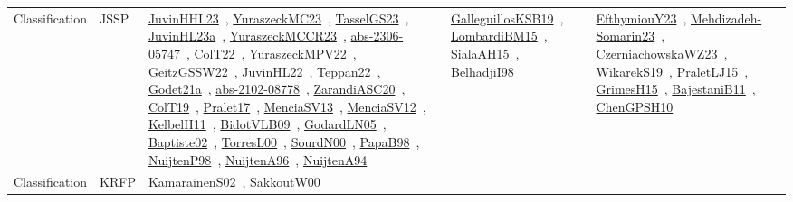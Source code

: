 {\begin{longtable}{lp{3cm}>{\raggedright\arraybackslash}p{6cm}>{\raggedright\arraybackslash}p{6cm}>{\raggedright\arraybackslash}p{8cm}}
Classification & JSSP & \href{works/JuvinHHL23.pdf}{JuvinHHL23}~\cite{JuvinHHL23}, \href{works/YuraszeckMC23.pdf}{YuraszeckMC23}~\cite{YuraszeckMC23}, \href{works/TasselGS23.pdf}{TasselGS23}~\cite{TasselGS23}, \href{works/JuvinHL23a.pdf}{JuvinHL23a}~\cite{JuvinHL23a}, \href{works/YuraszeckMCCR23.pdf}{YuraszeckMCCR23}~\cite{YuraszeckMCCR23}, \href{works/abs-2306-05747.pdf}{abs-2306-05747}~\cite{abs-2306-05747}, \href{works/ColT22.pdf}{ColT22}~\cite{ColT22}, \href{works/YuraszeckMPV22.pdf}{YuraszeckMPV22}~\cite{YuraszeckMPV22}, \href{works/GeitzGSSW22.pdf}{GeitzGSSW22}~\cite{GeitzGSSW22}, \href{works/JuvinHL22.pdf}{JuvinHL22}~\cite{JuvinHL22}, \href{works/Teppan22.pdf}{Teppan22}~\cite{Teppan22}, \href{works/Godet21a.pdf}{Godet21a}~\cite{Godet21a}, \href{works/abs-2102-08778.pdf}{abs-2102-08778}~\cite{abs-2102-08778}, \href{works/ZarandiASC20.pdf}{ZarandiASC20}~\cite{ZarandiASC20}, \href{works/ColT19.pdf}{ColT19}~\cite{ColT19}, \href{works/Pralet17.pdf}{Pralet17}~\cite{Pralet17}, \href{works/MenciaSV13.pdf}{MenciaSV13}~\cite{MenciaSV13}, \href{works/MenciaSV12.pdf}{MenciaSV12}~\cite{MenciaSV12}, \href{works/KelbelH11.pdf}{KelbelH11}~\cite{KelbelH11}, \href{works/BidotVLB09.pdf}{BidotVLB09}~\cite{BidotVLB09}, \href{works/GodardLN05.pdf}{GodardLN05}~\cite{GodardLN05}, \href{works/Baptiste02.pdf}{Baptiste02}~\cite{Baptiste02}, \href{works/TorresL00.pdf}{TorresL00}~\cite{TorresL00}, \href{works/SourdN00.pdf}{SourdN00}~\cite{SourdN00}, \href{works/PapaB98.pdf}{PapaB98}~\cite{PapaB98}, \href{works/NuijtenP98.pdf}{NuijtenP98}~\cite{NuijtenP98}, \href{works/NuijtenA96.pdf}{NuijtenA96}~\cite{NuijtenA96}, \href{works/NuijtenA94.pdf}{NuijtenA94}~\cite{NuijtenA94} & \href{works/GalleguillosKSB19.pdf}{GalleguillosKSB19}~\cite{GalleguillosKSB19}, \href{works/LombardiBM15.pdf}{LombardiBM15}~\cite{LombardiBM15}, \href{works/SialaAH15.pdf}{SialaAH15}~\cite{SialaAH15}, \href{works/BelhadjiI98.pdf}{BelhadjiI98}~\cite{BelhadjiI98} & \href{works/EfthymiouY23.pdf}{EfthymiouY23}~\cite{EfthymiouY23}, \href{works/Mehdizadeh-Somarin23.pdf}{Mehdizadeh-Somarin23}~\cite{Mehdizadeh-Somarin23}, \href{works/CzerniachowskaWZ23.pdf}{CzerniachowskaWZ23}~\cite{CzerniachowskaWZ23}, \href{works/WikarekS19.pdf}{WikarekS19}~\cite{WikarekS19}, \href{works/PraletLJ15.pdf}{PraletLJ15}~\cite{PraletLJ15}, \href{works/GrimesH15.pdf}{GrimesH15}~\cite{GrimesH15}, \href{works/BajestaniB11.pdf}{BajestaniB11}~\cite{BajestaniB11}, \href{works/ChenGPSH10.pdf}{ChenGPSH10}~\cite{ChenGPSH10}\\
Classification & KRFP & \href{works/KamarainenS02.pdf}{KamarainenS02}~\cite{KamarainenS02}, \href{works/SakkoutW00.pdf}{SakkoutW00}~\cite{SakkoutW00} &  & \\

\end{longtable}}
